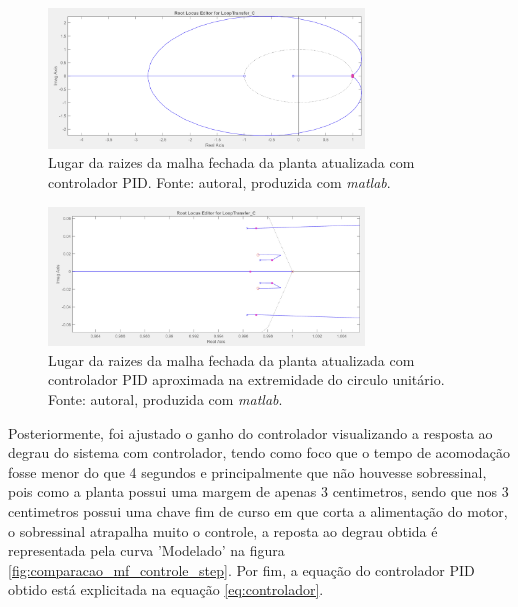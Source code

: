 \documentclass{ifacconf}
\begin{document}
\begin{figure}[!htb]
  \begin{center}
  \includegraphics[width=8.4cm]{figures/lugar_raizes_controlador_finalpng.png}    %
  \caption{Lugar da raizes da malha fechada da planta atualizada com controlador PID. Fonte: autoral, produzida com \textit{matlab}.} 
  \label{fig:lugar_raizes_mf_atualizada_controlador}
  \end{center}
\end{figure}


\begin{figure}[!htb]
  \begin{center}
  \includegraphics[width=8.4cm]{figures/lugar_raizes_controlador_final_zoom.png}    %
  \caption{Lugar da raizes da malha fechada da planta atualizada com controlador PID aproximada na extremidade do circulo unitário. Fonte: autoral, produzida com \textit{matlab}.} 
  \label{fig:lugar_raizes_mf_atualizada_controlador_zoom}
  \end{center}
\end{figure}

Posteriormente, foi ajustado o ganho do controlador visualizando a resposta ao degrau do sistema com controlador, tendo como foco que o tempo de acomodação
fosse menor do que 4 segundos e principalmente que não houvesse sobressinal, pois como a planta possui uma margem de apenas 3 centimetros, sendo que nos 3 centimetros
possui uma chave fim de curso em que corta a alimentação do motor, o sobressinal atrapalha muito o controle, a reposta ao degrau obtida é representada pela curva 'Modelado' na figura \ref{fig:comparacao_mf_controle_step}.
Por fim, a equação do controlador PID obtido está explicitada na equação \ref{eq:controlador}.
\end{document}
